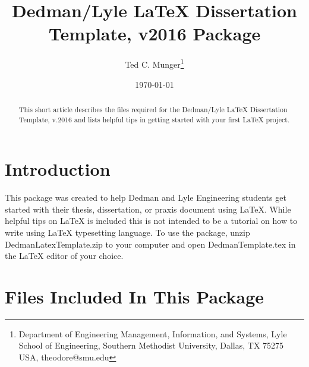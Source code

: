 \documentclass[a4paper]{article}
\title{Dedman/Lyle LaTeX Dissertation Template, v2016 Package}
\author{Ted C. Munger\thanks{Department of Engineering Management, Information, and Systems, Lyle School of Engineering, Southern Methodist University, Dallas, TX 75275 USA, theodore@smu.edu}}
\date{\today}
\begin{document}
\maketitle

\begin{abstract}
This short article describes the files required for the Dedman/Lyle LaTeX Dissertation Template, v.2016 and lists helpful tips in getting started with your first \LaTeX {} project.
\end{abstract}

\section{Introduction}

This package was created to help Dedman and Lyle Engineering students get started with their thesis, dissertation, or praxis document using \LaTeX {}. While helpful tips on \LaTeX {} is included this is not intended to be a tutorial on how to write using \LaTeX {} typesetting language.  To use the package, unzip DedmanLatexTemplate.zip to your computer and open DedmanTemplate.tex in the \LaTeX {} editor of your choice.

\section{Files Included In This Package}\label{sec:files}
\end{document}
